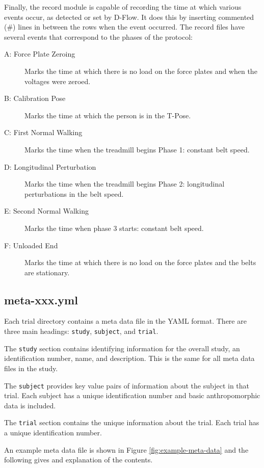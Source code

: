 \documentclass[10pt,a4paper,twocolumn]{article}
\begin{document}
Finally, the record module is capable of recording the time at which various
events occur, as detected or set by D-Flow. It does this by inserting commented
(\#) lines in between the rows when the event occurred. The record files have
several events that correspond to the phases of the protocol:

\begin{description}
  \item[A: Force Plate Zeroing] Marks the time at which there is no load on the
    force plates and when the voltages were zeroed.
  \item[B: Calibration Pose] Marks the time at which the person is in the
    T-Pose.
  \item[C: First Normal Walking] Marks the time when the treadmill begins Phase
    1: constant belt speed.
  \item[D: Longitudinal Perturbation] Marks the time when the treadmill begins
    Phase 2: longitudinal perturbations in the belt speed.
  \item[E: Second Normal Walking] Marks the time when phase 3 starts: constant
    belt speed.
  \item[F: Unloaded End] Marks the time at which there is no load on the force
    plates and the belts are stationary.
\end{description}

\subsection*{meta-xxx.yml}

Each trial directory contains a meta data file in the YAML format. There are
three main headings: \verb+study+, \verb+subject+, and \verb+trial+.

The \verb+study+ section contains identifying information for the overall
study, an identification number, name, and description. This is the same for
all meta data files in the study.

The \verb+subject+ provides key value pairs of information about the subject in
that trial. Each subject has a unique identification number and basic
anthropomorphic data is included.

The \verb+trial+ section contains the unique information about the trial. Each
trial has a unique identification number.

An example meta data file is shown in Figure \ref{fig:example-meta-data} and
the following gives and explanation of the contents.
\end{document}
